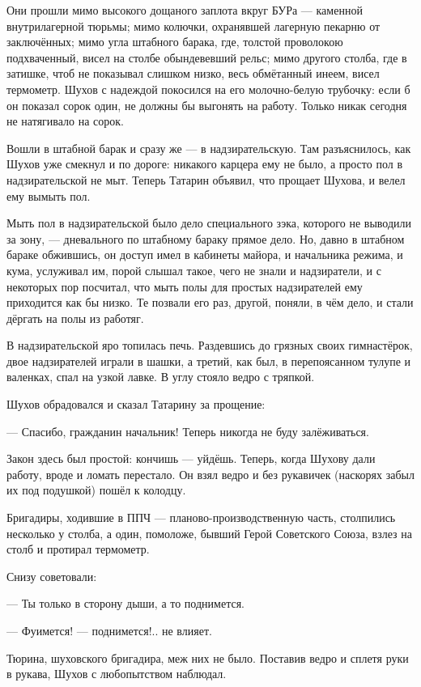 Они прошли мимо высокого дощаного заплота вкруг БУРа --- каменной внутрилагерной тюрьмы; 
мимо колючки, охранявшей лагерную пекарню от заключённых; мимо угла штабного барака, где, 
толстой проволокою подхваченный, висел на столбе обындевевший рельс; мимо другого столба, 
где в затишке, чтоб не показывал слишком низко, весь обмётанный инеем, висел термометр. Шухов 
с надеждой покосился на его молочно-белую трубочку: если б он показал сорок один, не должны 
бы выгонять на работу. Только никак сегодня не натягивало на сорок.

Вошли в штабной барак и сразу же --- в надзирательскую. Там разъяснилось, как Шухов уже 
смекнул и по дороге: никакого карцера ему не было, а просто пол в надзирательской не мыт. 
Теперь Татарин объявил, что прощает Шухова, и велел ему вымыть пол.

Мыть пол в надзирательской было дело специального зэка, которого не выводили за зону, --- 
дневального по штабному бараку прямое дело. Но, давно в штабном бараке обжившись, он доступ 
имел в кабинеты майора, и начальника режима, и кума, услуживал им, порой слышал такое, чего не 
знали и надзиратели, и с некоторых пор посчитал, что мыть полы для простых надзирателей ему 
приходится как бы низко. Те позвали его раз, другой, поняли, в чём дело, и стали дёргать на 
полы из работяг.

В надзирательской яро топилась печь. Раздевшись до грязных своих гимнастёрок, двое 
надзирателей играли в шашки, а третий, как был, в перепоясанном тулупе и валенках, спал на 
узкой лавке. В углу стояло ведро с тряпкой.

Шухов обрадовался и сказал Татарину за прощение:

--- Спасибо, гражданин начальник! Теперь никогда не буду залёживаться.

Закон здесь был простой: кончишь --- уйдёшь. Теперь, когда Шухову дали работу, вроде и ломать 
перестало. Он взял ведро и без рукавичек (наскорях забыл их под подушкой) пошёл к колодцу.

Бригадиры, ходившие в ППЧ --- планово-производственную часть, столпились несколько у столба, 
а один, помоложе, бывший Герой Советского Союза, взлез на столб и протирал термометр.

Снизу советовали:

--- Ты только в сторону дыши, а то поднимется.

--- Фуимется! --- поднимется!.. не влияет.

Тюрина, шуховского бригадира, меж них не было. Поставив ведро и сплетя руки в рукава, Шухов с 
любопытством наблюдал.

